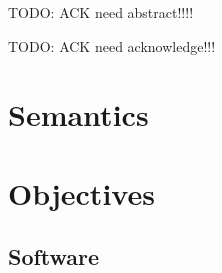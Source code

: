 \documentclass[final,12pt,twoside]{mcthesis}
\begin{document}
\sloppy
\frontmatter
{}
\thesisdate{\today}

\makepretitle
\maketitle

\newcommand{\imgsmall}{100px}
\newcommand{\imgmedsmall}{120px}
\newcommand{\imgmed}{150px}
\newcommand{\imgsmlphoto}{175px}
\newcommand{\imgmedphoto}{200px}
\newcommand{\imgmedium}{300px}

\newcommand{\emphasize}[1]{\textit{#1}}
\newcommand{\plccharts}{\emphasize{Logic Control Chart} }
\newcommand{\plcchart}{Logic Control Chart}

\newtheorem{definition}{Definition}[section]

\setcounter{secnumdepth}{3}
\setcounter{tocdepth}{3}
{}
TODO: ACK need abstract!!!!
\newpage
{}
TODO: ACK need acknowledge!!!




\tableofcontents
\listoftables
\listoffigures

\label{pre end}
\mainmatter

\part{Semantics}





\part{Objectives}

\chapter{Software}
\label{ch:software}



\newpage
   

\newpage
        
\end{document}
